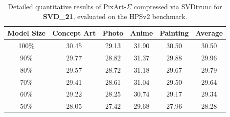 \begin{table}[H]
	\centering
	{%
		
		\begin{tabular}{cccccc}
			
			\toprule
			\multicolumn{1}{c}{\textbf{Model Size}} &
			\multicolumn{1}{c}{Concept Art} &
			\multicolumn{1}{c}{Photo} &
			\multicolumn{1}{c}{Anime} &
			\multicolumn{1}{c}{Painting} &
			\multicolumn{1}{c}{Average}\\
			\midrule
			
		

						 \color{gray} 100\%  %
							& \color{gray} 30.45  %
							& \color{gray} 29.13  %
							& \color{gray} 31.90  %
							& \color{gray} 30.50  %
							& \color{gray} 30.50  %
							\\
							\midrule
					
							90\% &    %
							29.77 &    %
							28.82 &    %
							31.37 &    %
							29.88 &    %
							29.96     %
							\\
						
							80\% &    %
							29.57 &    %
							28.72 &    %
							31.18 &    %
							29.67 &    %
							29.79     %
							\\
						
							70\% &    %
							29.41 &    %
							28.61 &    %
							31.04 &    %
							29.50 &    %
							29.64     %
							\\
						
							60\% &    %
							29.22 &    %
							28.25 &    %
							30.74 &    %
							29.17 &    %
							29.34     %
							\\
						
							50\% &    %
							28.05 &    %
							27.42 &    %
							29.68 &    %
							27.96 &    %
							28.28    %
							\\
			\bottomrule
		\end{tabular}
	}
	\smallskip
	\caption[\gls{SVD}trunc on PixArt-$\Sigma$: Detailed HPSv2 Results]{Detailed quantitative results of PixArt-$\Sigma$ compressed via \gls{SVD}trunc for \textbf{SVD\_21}, evaluated on the HPSv2 benchmark.}
	\label{tab:PixArt_HPSV2}
\end{table}

